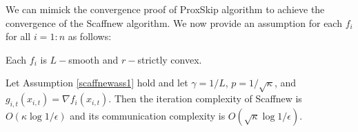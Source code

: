 \begin{itemize}
We can mimick the convergence proof of ProxSkip algorithm to achieve the convergence of the Scaffnew algorithm. We now provide an assumption for each $f_i$ for all $i=1:n$ as follows: 
\begin{assump}\label{scaffnewass1} 
Each $f_i$ is $L-$smooth and $r-$strictly convex. 
\end{assump}
\begin{corollary}
Let Assumption \ref{scaffnewass1} hold and let $\gamma = 1/L$, $p = 1/\sqrt{\kappa}$, and $g_{i,t}(x_{i,t}) = \nabla f_i(x_{i,t})$. Then the iteration complexity of Scaffnew is $O(\kappa \log 1/\epsilon)$ and its communication complexity is $O(\sqrt{\kappa} \log 1/\epsilon)$.   
\end{corollary}

\newpage 


\end{itemize}
